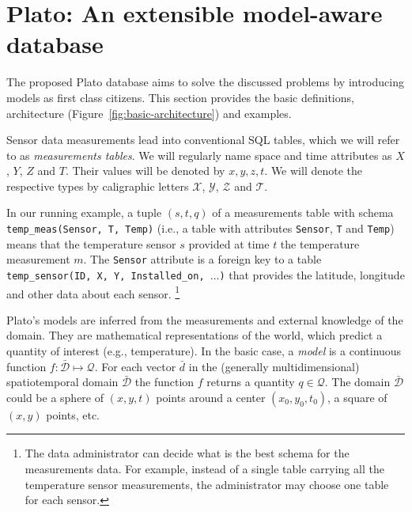 
\section{Plato: An extensible model-aware database}
\label{sec:architecture}
The proposed Plato database aims to solve the discussed problems by introducing models as first class citizens. This section provides the basic definitions, architecture (Figure~\ref{fig:basic-architecture}) and examples.

Sensor data measurements lead into conventional SQL tables, which we will refer to as {\em measurements tables}.  We will regularly name space and time attributes as $X$, $Y$, $Z$ and $T$. Their values will be denoted by $x, y, z, t$. We will denote the respective types by caligraphic letters $\mathcal{X}$, $\mathcal{Y}$, $\mathcal{Z}$ and $\mathcal{T}$.
\begin{example}
In our running example, a tuple $(s, t, q)$ of a measurements table with schema \texttt{temp\_meas(Sensor, T, Temp)} (i.e., a table with attributes \texttt{Sensor}, \texttt{T} and \texttt{Temp}) means that the temperature sensor $s$ provided at time $t$ the temperature measurement $m$. The \texttt{Sensor} attribute is a foreign key to a table \texttt{temp\_sensor(ID, X, Y, Installed\_on, $\ldots$)} that provides the latitude, longitude and other data about each sensor.%
\footnote{The data administrator can decide what is the best schema for the measurements data. For example, instead of a single table carrying all the temperature sensor measurements, the administrator may choose one table for each sensor.
}
\end{example}

Plato's models are inferred from the measurements and external knowledge of the domain. They are mathematical representations of the world, which predict a quantity of interest (e.g., temperature).
In the basic case, a {\em model} is a continuous function $f:\mathcal{\bar{D}}\mapsto \mathcal{Q}$. For each vector $\bar{d}$ in the (generally multidimensional) spatiotemporal domain $\mathcal{\bar{D}}$ the function $f$ returns a quantity $q \in \mathcal{Q}$. The domain $\mathcal{\bar{D}}$ could be a sphere of $(x, y, t)$ points around a center $(x_0, y_0, t_0)$, a square of $(x, y)$ points, etc.

